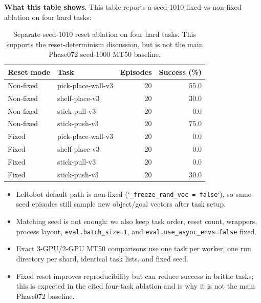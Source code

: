 \documentclass{article}
\begin{document}
\textbf{What this table shows}. This table reports a seed-1010 fixed-vs-non-fixed ablation on four hard tasks:

\begin{table}[H]
  \centering
  \small
  \begin{tabular}{llrr}
    \toprule
    Reset mode & Task & Episodes & Success (\%) \\
    \midrule
    Non-fixed & pick-place-wall-v3 & 20 & 55.0 \\
    Non-fixed & shelf-place-v3 & 20 & 30.0 \\
    Non-fixed & stick-pull-v3 & 20 & 0.0 \\
    Non-fixed & stick-push-v3 & 20 & 75.0 \\
    \midrule
    Fixed & pick-place-wall-v3 & 20 & 0.0 \\
    Fixed & shelf-place-v3 & 20 & 0.0 \\
    Fixed & stick-pull-v3 & 20 & 0.0 \\
    Fixed & stick-push-v3 & 20 & 30.0 \\
    \bottomrule
  \end{tabular}
  \caption{Separate seed-1010 reset ablation on four hard tasks.  This supports the reset-determinism discussion, but is not the main Phase072 seed-1000 MT50 baseline.}
  \label{tab:mt50-reset-ablation-s1010}
\end{table}
\begin{itemize}
  \item LeRobot default path is non-fixed (`\texttt{\_freeze\_rand\_vec = false}`), so same-seed episodes still sample new object/goal vectors after task setup.
  \item Matching seed is not enough: we also keep task order, reset count, wrappers, process layout, \texttt{eval.batch\_size=1}, and \texttt{eval.use\_async\_envs=false} fixed.
  \item Exact 3-GPU/2-GPU MT50 comparisons use one task per worker, one run directory per shard, identical task lists, and fixed seed.
  \item Fixed reset improves reproducibility but can reduce success in brittle tasks; this is expected in the cited four-task ablation and is why it is not the main Phase072 baseline.
\end{itemize}
\end{document}

